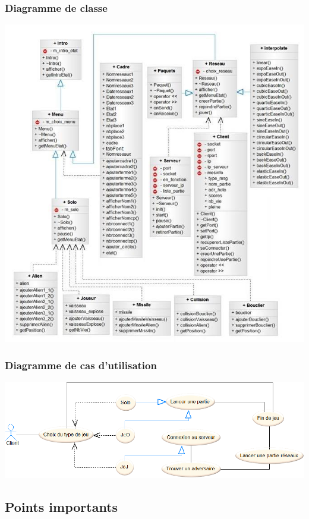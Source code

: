 \documentclass[french, 11pt]{report}
\begin{document}
		\subsubsection{Diagramme de classe}
			\begin{center}
				\centering
				\includegraphics[width=1\linewidth]{Diagramme_de_classe}
			\end{center}
		\subsubsection{Diagramme de cas d'utilisation}
			\begin{center}
				\centering
				\includegraphics[width=0.8\linewidth]{DiagrammeDeCasDutilisation}
			\end{center}
		
		\subsection{Points importants}
\end{document}
